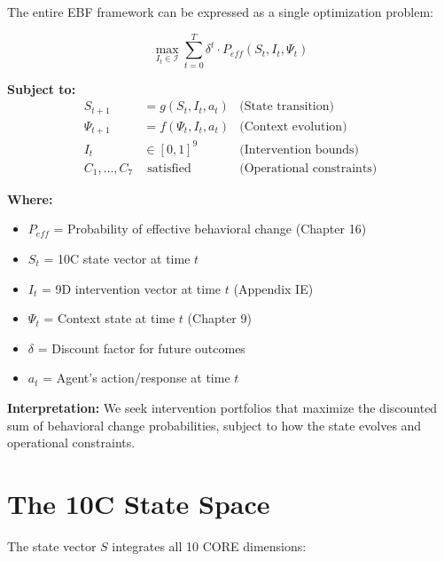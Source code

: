 The entire EBF framework can be expressed as a single optimization problem:

\begin{tcolorbox}[colback=blue!5!white,colframe=blue!75!black,
    title=\textbf{The EBF Master Problem (MP-1)}]
\begin{equation}
\max_{I_t \in \mathcal{I}} \sum_{t=0}^{T} \delta^t \cdot P_{eff}(S_t, I_t, \Psi_t)
\label{eq:master-problem}
\end{equation}

\textbf{Subject to:}
\begin{align}
    S_{t+1} &= g(S_t, I_t, a_t) & \text{(State transition)} \\
    \Psi_{t+1} &= f(\Psi_t, I_t, a_t) & \text{(Context evolution)} \\
    I_t &\in [0,1]^9 & \text{(Intervention bounds)} \\
    C_1, \ldots, C_7 &\text{ satisfied} & \text{(Operational constraints)}
\end{align}
\end{tcolorbox}

\textbf{Where:}
\begin{itemize}
    \item $P_{eff}$ = Probability of effective behavioral change (Chapter 16)
    \item $S_t$ = 10C state vector at time $t$
    \item $I_t$ = 9D intervention vector at time $t$ (Appendix IE)
    \item $\Psi_t$ = Context state at time $t$ (Chapter 9)
    \item $\delta$ = Discount factor for future outcomes
    \item $a_t$ = Agent's action/response at time $t$
\end{itemize}

\textbf{Interpretation:} We seek intervention portfolios that maximize the discounted sum of behavioral change probabilities, subject to how the state evolves and operational constraints.


\section{The 10C State Space}
\label{sec:25-state-space}

The state vector $S$ integrates all 10 CORE dimensions:

